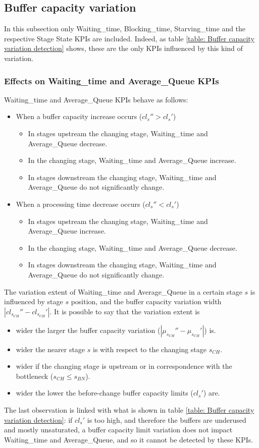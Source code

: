 \subsection{Buffer capacity variation}
In this subsection only Waiting\_time, Blocking\_time, Starving\_time and the respective Stage State KPIs are included. Indeed, as table \ref{table: Buffer capacity variation detection} shows, these are the only KPIs influenced by this kind of variation.
\subsubsection{Effects on Waiting\_time and Average\_Queue KPIs}
Waiting\_time and Average\_Queue KPIs behave as follows:
\begin{itemize}
\item When a buffer capacity increase occurs ($cl_s''>cl_s'$)
\begin{itemize}
\item In stages upstream the changing stage, Waiting\_time and Average\_Queue decrease.
\item In the changing stage, Waiting\_time and Average\_Queue increase.
\item In stages downstream the changing stage, Waiting\_time and Average\_Queue do not significantly change.
\end{itemize}
\item When a processing time decrease occurs ($cl_s''<cl_s'$)
\begin{itemize}
\item In stages upstream the changing stage, Waiting\_time and Average\_Queue increase.
\item In the changing stage, Waiting\_time and Average\_Queue decrease.
\item In stages downstream the changing stage, Waiting\_time and Average\_Queue do not significantly change.
\end{itemize}
\end{itemize}
The variation extent of Waiting\_time and Average\_Queue in a certain stage $s$ is influenced by stage $s$ position, and the buffer capacity variation width $|cl_{s_{CH}}''-cl_{s_{CH}}'|$. It is possible to say that the variation extent is 
\begin{itemize}
\item wider the larger the buffer capacity variation ($|\mu_{s_{CH}}''-\mu_{s_{CH}}'|$) is.
\item wider the nearer stage $s$ is with respect to the changing stage $s_{CH}$.
\item wider if the changing stage is upstream or in correspondence with the bottleneck ($s_{CH}\leqslant s_{BN}$).
\item wider the lower the before-change buffer capacity limits ($cl_s'$) are.
\end{itemize}
The last observation is linked with what is shown in table \ref{table: Buffer capacity variation detection}: if $cl_s'$ is too high, and therefore the buffers are underused and mostly unsaturated, a buffer capacity limit variation does not impact Waiting\_time and Average\_Queue, and so it cannot be detected by these KPIs. 
